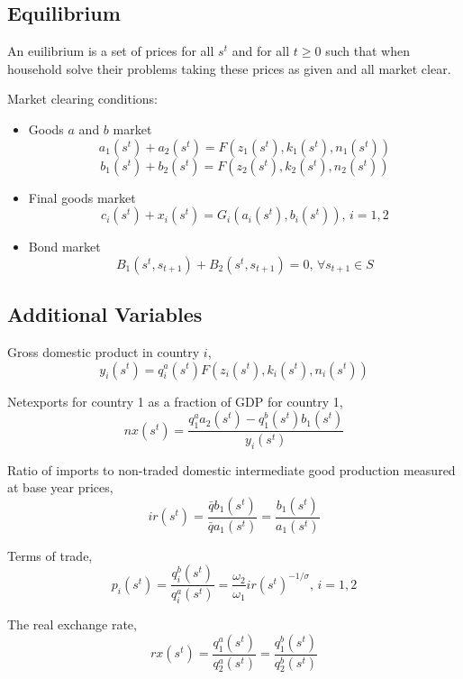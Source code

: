\documentclass[11pt,a4paper]{article}
\begin{document}
\subsection{Equilibrium}
An euilibrium is a set of prices for all $s^t$ and for all $t\geq 0$ such that when household solve their problems taking these prices as given and all market clear.

Market clearing conditions:
\begin{itemize}
	\item  Goods $a$ and $b$ market
    \begin{equation}
    a_1(s^t)+a_2(s^t)=F(z_1(s^t),k_1(s^t),n_1(s^t))
    \end{equation}
    \begin{equation}
    b_1(s^t)+b_2(s^t)=F(z_2(s^t),k_2(s^t),n_2(s^t))
    \end{equation}
    \item Final goods market
    \begin{equation}
    c_i(s^t)+x_i(s^t)=G_i(a_i(s^t),b_i(s^t)),\, i=1,2
    \end{equation}
    \item Bond market
    \begin{equation}
    B_1(s^t,s_{t+1})+B_2(s^t,s_{t+1})=0,\, \forall s_{t+1}\in S
    \end{equation}
    
\end{itemize}

\subsection{Additional Variables}
Gross domestic product in country $i$,
\begin{equation}
y_i(s^t)=q_i^a(s^t)F(z_i(s^t),k_i(s^t),n_i(s^t))
\end{equation}

Netexports for country 1 as a fraction of GDP for country 1,
\begin{equation}
nx(s^t)=\frac{q_1^aa_2(s^t)-q_1^b(s^t)b_1(s^t)}{y_i(s^t)}
\end{equation}

Ratio of imports to non-traded domestic intermediate good production measured at base year prices,
\begin{equation}
ir(s^t)=\frac{\bar{q}b_1(s^t)}{\bar{q}a_1(s^t)}=\frac{b_1(s^t)}{a_1(s^t)}
\end{equation}

Terms of trade,
\begin{equation}
p_i(s^t)=\frac{q_i^b(s^t)}{q_i^a(s^t)}=\frac{\omega_2}{\omega_1}{ir(s^t)}^{-1/\sigma},\,i=1,2
\end{equation}

The real exchange rate,
\begin{equation}
rx(s^t)=\frac{q_1^a(s^t)}{q_2^a(s^t)}=\frac{q_1^b(s^t)}{q_2^b(s^t)}
\end{equation}
\end{document}
